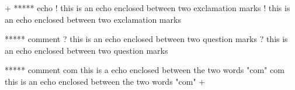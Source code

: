 



\gfexample+
   ***** echo ! this is an echo
   enclosed between two exclamation marks !
   this is an echo enclosed between two exclamation marks

   ***** comment ? this is an echo
   enclosed between two question marks ?
   this is an echo enclosed between two question marks

   ***** comment com this is a echo
   enclosed between the two words "com" com
   this is an echo enclosed between the two words "com"
+
